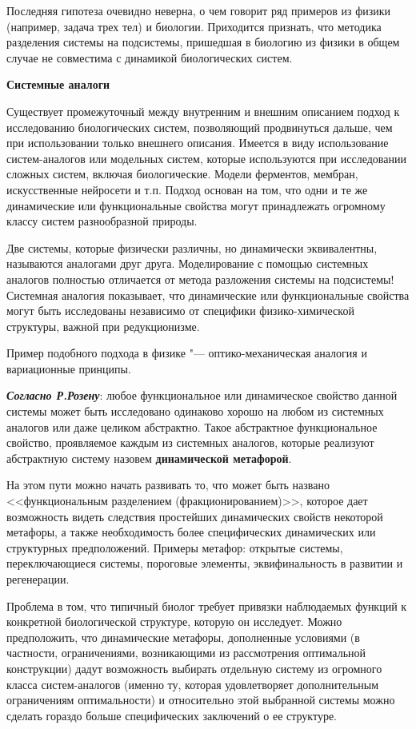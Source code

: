 \documentclass[12pt,a4paper,oneside]{book}
\begin{document}
Последняя гипотеза очевидно неверна, о чем говорит ряд примеров из физики (например, задача трех тел) и биологии. Приходится признать, что методика разделения системы на подсистемы, пришедшая в биологию из физики в общем случае не совместима с динамикой биологических систем. 


{\bf Системные аналоги}

Существует промежуточный между внутренним и внешним описанием подход к исследованию биологических систем, позволяющий продвинуться дальше, чем при использовании только внешнего описания. Имеется в виду использование систем-аналогов или модельных систем, которые используются при исследовании сложных систем, включая биологические. Модели ферментов, мембран, искусственные нейросети и т.п. Подход основан на том, что одни и те же динамические или функциональные свойства могут принадлежать огромному классу систем разнообразной природы.

Две системы, которые физически различны, но динамически эквивалентны, называются аналогами друг друга. Моделирование с помощью системных аналогов полностью отличается от метода разложения системы на подсистемы! Системная аналогия показывает, что динамические или функциональные свойства могут быть исследованы независимо от специфики физико-химической структуры, важной при редукционизме.

Пример подобного подхода в физике "--- оптико-механическая аналогия и вариационные принципы.

\textbf{{\it{\bf Согласно Р.Розену}}}: любое функциональное или динамическое свойство данной системы может быть исследовано одинаково хорошо на любом из системных аналогов или даже целиком абстрактно. Такое абстрактное функциональное свойство, проявляемое каждым из системных аналогов, которые реализуют абстрактную систему назовем {\bf динамической метафорой}.

На этом пути можно начать развивать то, что может быть названо <<функциональным разделением (фракционированием)>>, которое дает возможность видеть следствия простейших динамических свойств некоторой метафоры, а также необходимость более специфических динамических или структурных предположений. Примеры метафор: открытые системы, переключающиеся системы, пороговые элементы, эквифинальность в развитии и регенерации.

Проблема в том, что типичный биолог требует привязки наблюдаемых функций к конкретной биологической структуре, которую он исследует. Можно предположить, что динамические метафоры, дополненные условиями (в частности, ограничениями, возникающими из рассмотрения оптимальной конструкции) дадут возможность выбирать отдельную систему из огромного класса систем-аналогов (именно ту, которая удовлетворяет дополнительным ограничениям оптимальности) и относительно этой выбранной системы можно сделать гораздо больше специфических заключений о ее структуре.
\end{document}

